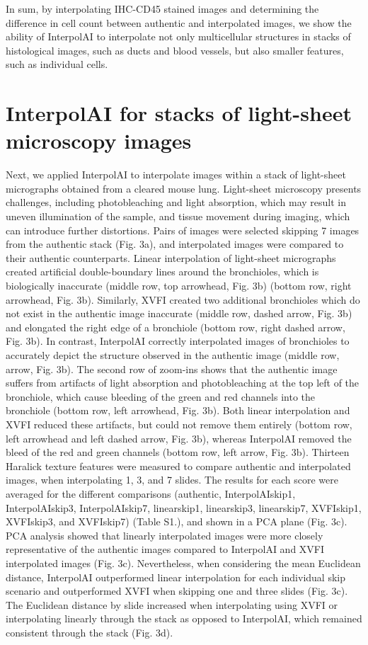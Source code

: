 \begin{refsection}
    In sum, by interpolating IHC-CD45 stained images and determining the difference in cell count between authentic and interpolated images, we show the ability of InterpolAI to interpolate not only multicellular structures in stacks of histological images, such as ducts and blood vessels, but also smaller features, such as individual cells. 
    
    
    
    \section{InterpolAI for stacks of light-sheet microscopy images}
    Next, we applied InterpolAI to interpolate images within a stack of light-sheet micrographs obtained from a cleared mouse lung. Light-sheet microscopy presents challenges, including photobleaching and light absorption, which may result in uneven illumination of the sample, and tissue movement during imaging, which can introduce further distortions. Pairs of images were selected skipping 7 images from the authentic stack (Fig. 3a), and interpolated images were compared to their authentic counterparts.    
    Linear interpolation of light-sheet micrographs created artificial double-boundary lines around the bronchioles, which is biologically inaccurate (middle row, top arrowhead, Fig. 3b) (bottom row, right arrowhead, Fig. 3b). Similarly, XVFI created two additional bronchioles which do not exist in the authentic image inaccurate (middle row, dashed arrow, Fig. 3b) and elongated the right edge of a bronchiole (bottom row, right dashed arrow, Fig. 3b). In contrast, InterpolAI correctly interpolated images of bronchioles to accurately depict the structure observed in the authentic image (middle row, arrow, Fig. 3b). The second row of zoom-ins shows that the authentic image suffers from artifacts of light absorption and photobleaching at the top left of the bronchiole, which cause bleeding of the green and red channels into the bronchiole (bottom row, left arrowhead, Fig. 3b). Both linear interpolation and XVFI reduced these artifacts, but could not remove them entirely (bottom row, left arrowhead and left dashed arrow, Fig. 3b), whereas InterpolAI removed the bleed of the red and green channels (bottom row, left arrow, Fig. 3b). 
    Thirteen Haralick texture features were measured to compare authentic and interpolated images, when interpolating 1, 3, and 7 slides. The results for each score were averaged for the different comparisons (authentic, InterpolAIskip1, InterpolAIskip3, InterpolAIskip7, linearskip1, linearskip3, linearskip7, XVFIskip1, XVFIskip3, and XVFIskip7) (Table S1.), and shown in a PCA plane (Fig. 3c). PCA analysis showed that linearly interpolated images were more closely representative of the authentic images compared to InterpolAI and XVFI interpolated images (Fig. 3c).  Nevertheless, when considering the mean Euclidean distance, InterpolAI outperformed linear interpolation for each individual skip scenario and outperformed XVFI when skipping one and three slides (Fig. 3c). The Euclidean distance by slide increased when interpolating using XVFI or interpolating linearly through the stack as opposed to InterpolAI, which remained consistent through the stack (Fig. 3d).

\end{refsection}
